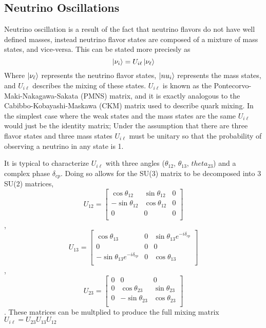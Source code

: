 \subsection{Neutrino Oscillations}
Neutrino oscillation is a result of the fact that neutrino flavors do not have
well defined masses, instead neutrino flavor states are composed of a mixture
of mass states, and vice-versa.
This can be stated more preciesly as
\begin{equation}
    \ket{\nu_{i}} = U_{i\ell}\ket{\nu_\ell}
\end{equation}
Where $\ket{\nu_\ell}$ represents the neutrino flavor states, $\ket{nu_i}$
represents the mass states, and $U_{i\ell}$ describes the mixing of these
states. $U_{i\ell}$ is known as the Pontecorvo-Maki-Nakagawa-Sakata (PMNS) matrix,
and it is exactly analogous to the Cabibbo-Kobayashi-Maskawa (CKM) matrix used
to describe quark mixing.
In the simplest case where the weak states and the mass states are the same
$U_{i\ell}$ would just be the identity matrix;
Under the assumption that there are three flavor states and three mass states
$U_{i\ell}$ must be unitary so that the probability of observing
a neutrino in any state is 1.

It is typical to characterize $U_{i\ell}$ with three angles
($\theta_{12}$, $\theta_{13}$, $theta_{23}$) and a complex
phase $\delta_{cp}$. Doing so allows for the SU(3) matrix to
be decomposed into 3 SU(2) matrices,
$$U_{12} =
\begin{bmatrix}
    \cos\theta_{12} & \sin\theta_{12} & 0  \\
    -\sin\theta_{12}& \cos\theta_{12} & 0  \\
    0 & 0 & 0  \\
\end{bmatrix}
$$,
$$
U_{13} =
\begin{bmatrix}
    \cos\theta_{13} & 0 & \sin\theta_{13}e^{-i\delta_{cp}}\\
    0 & 0 & 0  \\
    -\sin\theta_{13} e^{-i\delta_{cp}} & 0 & \cos\theta_{13}  \\
\end{bmatrix}
$$,
$$
U_{23} =
\begin{bmatrix}
    0 & 0 & 0  \\
    0 & \cos\theta_{23} & \sin\theta_{23} \\
    0 & -\sin\theta_{23} & \cos\theta_{23}   \\
\end{bmatrix}
$$.
These matrices can be multplied to produce the full mixing matrix
$U_{i\ell} = U_{23}U_{13}U_{12}$

